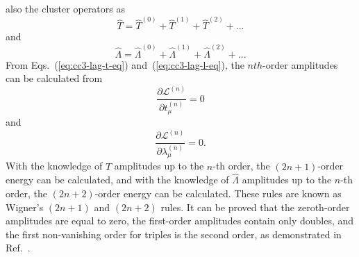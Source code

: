also the cluster operators as
\begin{equation}
\hat{T} = \hat{T}^{(0)} + \hat{T}^{(1)}+ \hat{T}^{(2)} + ...
\end{equation}
and
\begin{equation}
\hat{\Lambda} = \hat{\Lambda}^{(0)} + \hat{\Lambda}^{(1)} + \hat{\Lambda}^{(2)} + ...
\end{equation}
From Eqs.~(\ref{eq:cc3-lag-t-eq}) and~(\ref{eq:cc3-lag-l-eq}), the $nth$-order amplitudes can be calculated from
\begin{equation}
\frac{\partial{\mathcal{L}^{(n)}}}{\partial{t_{\mu}^{(n)}}}=0
\label{eq:cc3-partial-lag-t}
\end{equation}
and
\begin{equation}
\frac{\partial{\mathcal{L}^{(n)}}}{\partial{\lambda_{\mu}^{(n)}}}=0.
\label{eq:cc3-partial-lag-l}
\end{equation}
With the knowledge of $\hat{T}$ amplitudes up to the $n$-th order,  the $(2n+1)$-order energy can be calculated, and with the knowledge of $\hat{\Lambda}$ amplitudes up to the $n$-th order, the $(2n+2)$-order energy can be calculated. These rules are known as Wigner's $(2n+1)$ and $(2n+2)$ rules.\cite{Kvasnivcka1980, Shavitt2009} It can be proved that the zeroth-order amplitudes are equal to zero, the first-order amplitudes contain only doubles, and the first non-vanishing order for triples is the second order, as demonstrated in Ref.~.

